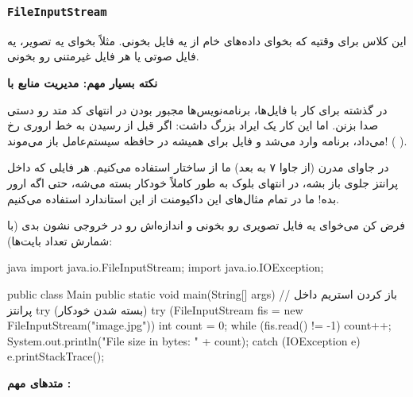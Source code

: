 \subsubsection{\texttt{FileInputStream}}

این کلاس برای وقتیه که بخوای داده‌های خام از یه فایل بخونی. مثلاً بخوای یه
تصویر، یه فایل صوتی یا هر فایل غیرمتنی رو بخونی.

\textbf{نکته بسیار مهم: مدیریت منابع با }

در گذشته برای کار با فایل‌ها، برنامه‌نویس‌ها مجبور بودن در انتهای کد متد
 رو دستی صدا بزنن. اما این کار یک ایراد بزرگ داشت:
اگر قبل از رسیدن به خط  اروری رخ می‌داد، برنامه وارد
 می‌شد و فایل برای همیشه در حافظه سیستم‌عامل باز
می‌موند! (  ).

در جاوای مدرن (از جاوا ۷ به بعد) ما از ساختار 
استفاده می‌کنیم. هر فایلی که داخل پرانتز جلوی  باز بشه،
در انتهای بلوک به طور کاملاً خودکار بسته می‌شه، حتی اگه ارور بده! ما در
تمام مثال‌های این داکیومنت از این استاندارد استفاده می‌کنیم.

فرض کن می‌خوای یه فایل تصویری رو بخونی و اندازه‌اش رو در خروجی نشون بدی
(با شمارش تعداد بایت‌ها):

\begin{codebox}{java}
import java.io.FileInputStream;
import java.io.IOException;

public class Main {
    public static void main(String[] args) {
        // باز کردن استریم داخل پرانتز try (بسته شدن خودکار)
        try (FileInputStream fis = new FileInputStream("image.jpg")) {
            int count = 0;
            while (fis.read() != -1) {
                count++;
            }
            System.out.println("File size in bytes: " + count);
        } catch (IOException e) {
            e.printStackTrace();
        }
    }
}
\end{codebox}

\textbf{متدهای مهم :}

